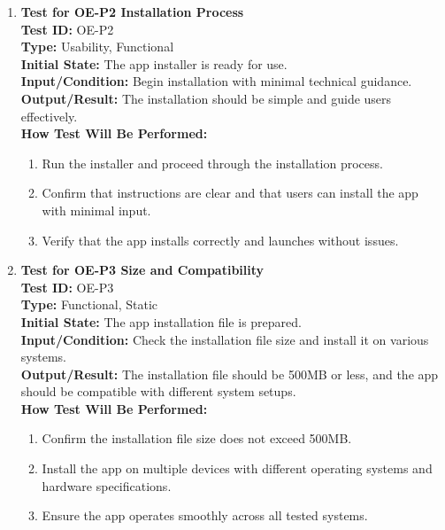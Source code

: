 \documentclass[12pt, titlepage]{article}
\begin{document}
\begin{enumerate}
    \item \textbf{Test for OE-P2 Installation Process} \\
      \newline
      \textbf{Test ID:} OE-P2 \\
      \textbf{Type:} Usability, Functional \\
      \textbf{Initial State:} The app installer is ready for use. \\
      \textbf{Input/Condition:} Begin installation with minimal technical guidance. \\
      \textbf{Output/Result:} The installation should be simple and guide users effectively. \\
      \textbf{How Test Will Be Performed:}
      \begin{enumerate}
          \item Run the installer and proceed through the installation process.
          \item Confirm that instructions are clear and that users can install the app with minimal input.
          \item Verify that the app installs correctly and launches without issues.
      \end{enumerate}

    \item \textbf{Test for OE-P3 Size and Compatibility} \\
      \newline
      \textbf{Test ID:} OE-P3 \\
      \textbf{Type:} Functional, Static \\
      \textbf{Initial State:} The app installation file is prepared. \\
      \textbf{Input/Condition:} Check the installation file size and install it on various systems. \\
      \textbf{Output/Result:} The installation file should be 500MB or less, and the app should be compatible with different system setups. \\
      \textbf{How Test Will Be Performed:}
      \begin{enumerate}
          \item Confirm the installation file size does not exceed 500MB.
          \item Install the app on multiple devices with different operating systems and hardware specifications.
          \item Ensure the app operates smoothly across all tested systems.
      \end{enumerate}


\end{enumerate}
\end{document}
